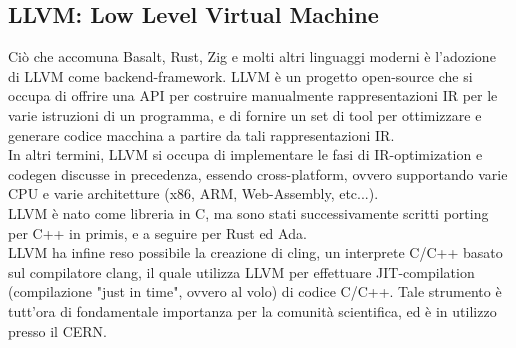 \subsection{LLVM: Low Level Virtual Machine}
Ciò che accomuna Basalt, Rust, Zig e molti altri linguaggi moderni è l'adozione di LLVM come backend-framework.
LLVM è un progetto open-source che si occupa di offrire una API per costruire manualmente rappresentazioni IR per 
le varie istruzioni di un programma, e di fornire un set di tool per ottimizzare e generare codice macchina a partire
da tali rappresentazioni IR. \\ 

In altri termini, LLVM si occupa di implementare le fasi di IR-optimization e codegen discusse in precedenza, 
essendo cross-platform, ovvero supportando varie CPU e varie architetture (x86, ARM, Web-Assembly, etc...). \\

LLVM è nato come libreria in C, ma sono stati successivamente scritti porting per C++ in primis, e a seguire 
per Rust ed Ada. \\

LLVM ha infine reso possibile la creazione di cling, un interprete C/C++ basato sul compilatore clang, il quale 
utilizza LLVM per effettuare JIT-compilation (compilazione "just in time", ovvero al volo) di codice C/C++. Tale 
strumento è tutt'ora di fondamentale importanza per la comunità scientifica, ed è in utilizzo presso il CERN.

\newpage